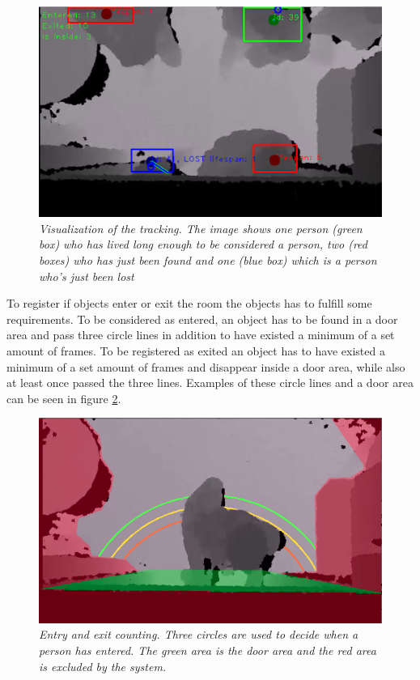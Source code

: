 \begin{figure}[htb]
	\centering
	\includegraphics[width=0.7\linewidth]{images/trackingexample2.png}
	\caption[Tracking visualization]{\textit{Visualization of the tracking. The image shows one person (green box) who has lived long enough to be considered a person, two (red boxes) who has just been found and one (blue box) which is a person who’s just been lost}}
	\label{fig:trackingexample}  %
\end{figure}


To register if objects enter or exit the room the objects has to fulfill some requirements. To be considered as entered, an object has to be found in a door area and pass three circle lines in addition to have existed a minimum of a set amount of frames. To be registered as exited an object has to have existed a minimum of a set amount of frames and disappear inside a door area, while also at least once passed the three lines. Examples of these circle lines and a door area can be seen in figure \ref{fig:entry_exit}.

\begin{figure}[htb]
	\centering
	\includegraphics[width=0.7\linewidth]{images/entryexitexample.png}
	\caption[Checkpoint circles]{\textit{Entry and exit counting. Three circles are used to decide when a person has entered. The green area is the door area and the red area is excluded by the system.}}
	\label{fig:entry_exit}  %
\end{figure}

